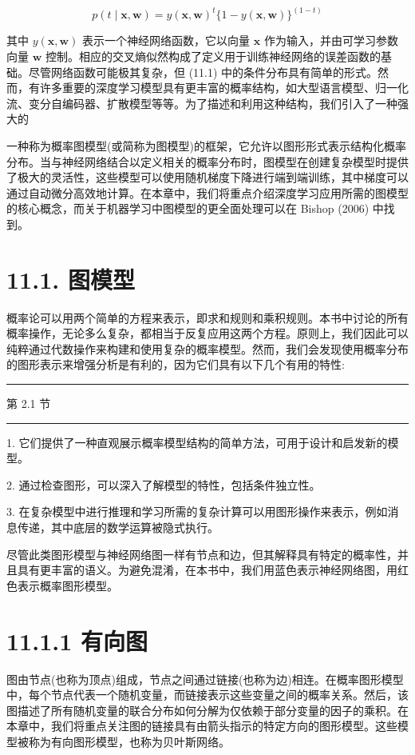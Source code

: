 \documentclass[10pt]{article}
\newcommand{\HRule}{\begin{center}\rule{0.9\linewidth}{0.2mm}\end{center}}
\begin{document}
\[
p\left( {t \mid  \mathbf{x},\mathbf{w}}\right)  = y{\left( \mathbf{x},\mathbf{w}\right) }^{t}\{ 1 - y\left( {\mathbf{x},\mathbf{w}}\right) {\} }^{\left( 1 - t\right) } \tag{11.1}
\]

其中 \(y\left( {\mathbf{x},\mathbf{w}}\right)\) 表示一个神经网络函数，它以向量 \(\mathbf{x}\) 作为输入，并由可学习参数向量 \(\mathbf{w}\) 控制。相应的交叉熵似然构成了定义用于训练神经网络的误差函数的基础。尽管网络函数可能极其复杂，但 (11.1) 中的条件分布具有简单的形式。然而，有许多重要的深度学习模型具有更丰富的概率结构，如大型语言模型、归一化流、变分自编码器、扩散模型等等。为了描述和利用这种结构，我们引入了一种强大的

一种称为概率图模型(或简称为图模型)的框架，它允许以图形形式表示结构化概率分布。当与神经网络结合以定义相关的概率分布时，图模型在创建复杂模型时提供了极大的灵活性，这些模型可以使用随机梯度下降进行端到端训练，其中梯度可以通过自动微分高效地计算。在本章中，我们将重点介绍深度学习应用所需的图模型的核心概念，而关于机器学习中图模型的更全面处理可以在 Bishop (2006) 中找到。

\section*{11.1. 图模型}

概率论可以用两个简单的方程来表示，即求和规则和乘积规则。本书中讨论的所有概率操作，无论多么复杂，都相当于反复应用这两个方程。原则上，我们因此可以纯粹通过代数操作来构建和使用复杂的概率模型。然而，我们会发现使用概率分布的图形表示来增强分析是有利的，因为它们具有以下几个有用的特性:

\HRule

第 2.1 节

\HRule

1. 它们提供了一种直观展示概率模型结构的简单方法，可用于设计和启发新的模型。

2. 通过检查图形，可以深入了解模型的特性，包括条件独立性。

3. 在复杂模型中进行推理和学习所需的复杂计算可以用图形操作来表示，例如消息传递，其中底层的数学运算被隐式执行。

尽管此类图形模型与神经网络图一样有节点和边，但其解释具有特定的概率性，并且具有更丰富的语义。为避免混淆，在本书中，我们用蓝色表示神经网络图，用红色表示概率图形模型。

\section*{11.1.1 有向图}

图由节点(也称为顶点)组成，节点之间通过链接(也称为边)相连。在概率图形模型中，每个节点代表一个随机变量，而链接表示这些变量之间的概率关系。然后，该图描述了所有随机变量的联合分布如何分解为仅依赖于部分变量的因子的乘积。在本章中，我们将重点关注图的链接具有由箭头指示的特定方向的图形模型。这些模型被称为有向图形模型，也称为贝叶斯网络。
\end{document}
